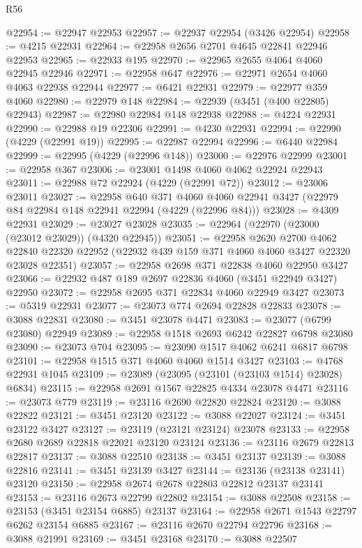 \begin{lexlean}{R56}
\begin{coremodule}
@22954 := @22947 @22953
@22957 := @22937 @22954 (@3426 @22954)
@22958 := @4215 @22931
@22964 := @22958 @2656 @2701 @4645 @22841 @22946 @22953
@22965 := @22933 @195
@22970 := @22965 @2655 @4064 @4060 @22945 @22946
@22971 := @22958 @647
@22976 := @22971 @2654 @4060 @4063 @22938 @22944
@22977 := @6421 @22931
@22979 := @22977 @359 @4060
@22980 := @22979 @148
@22984 := @22939 (@3451 (@400 @22805) @22943)
@22987 := @22980 @22984 @148 @22938
@22988 := @4224 @22931
@22990 := @22988 @19 @22306
@22991 := @4230 @22931
@22994 := @22990 (@4229 (@22991 @19))
@22995 := @22987 @22994
@22996 := @6440 @22984
@22999 := @22995 (@4229 (@22996 @148))
@23000 := @22976 @22999
@23001 := @22958 @367
@23006 := @23001 @1498 @4060 @4062 @22924 @22943
@23011 := @22988 @72 @22924 (@4229 (@22991 @72))
@23012 := @23006 @23011
@23027 := @22958
    @640
    @371
    @4060
    @4060
    @22941
    @3427
    (@22979 @84 @22984 @148 @22941 @22994 (@4229 (@22996 @84)))
@23028 := @4309 @22931
@23029 := @23027 @23028
@23035 := @22964 (@22970 (@23000 (@23012 @23029)) (@4320 @22945))
@23051 := @22958
    @2620
    @2700
    @4062
    @22840
    @22320
    @22952
    (@22932 @439 @159 @371 @4060 @4060 @3427 @22320 @23028 @22351)
@23057 := @22958 @2698 @371 @22838 @4060 @22950 @3427
@23066 := @22932 @487 @189 @2697 @22836 @4060 (@3451 @22949 @3427) @22950
@23072 := @22958 @2695 @371 @22834 @4060 @22949 @3427
@23073 := @5319 @22931
@23077 := @23073 @774 @2694 @22828 @22833
@23078 := @3088 @22831
@23080 := @3451 @23078 @4471
@23083 := @23077 (@6799 @23080) @22949
@23089 := @22958 @1518 @2693 @6242 @22827 @6798 @23080
@23090 := @23073 @704
@23095 := @23090 @1517 @4062 @6241 @6817 @6798
@23101 := @22958 @1515 @371 @4060 @4060 @1514 @3427
@23103 := @4768 @22931 @1045
@23109 := @23089 (@23095 (@23101 (@23103 @1514) @23028) @6834)
@23115 := @22958 @2691 @1567 @22825 @4334 @23078 @4471
@23116 := @23073 @779
@23119 := @23116 @2690 @22820 @22824
@23120 := @3088 @22822
@23121 := @3451 @23120
@23122 := @3088 @22027
@23124 := @3451 @23122 @3427
@23127 := @23119 (@23121 @23124) @23078
@23133 := @22958 @2680 @2689 @22818 @22021 @23120 @23124
@23136 := @23116 @2679 @22813 @22817
@23137 := @3088 @22510
@23138 := @3451 @23137
@23139 := @3088 @22816
@23141 := @3451 @23139 @3427
@23144 := @23136 (@23138 @23141) @23120
@23150 := @22958 @2674 @2678 @22803 @22812 @23137 @23141
@23153 := @23116 @2673 @22799 @22802
@23154 := @3088 @22508
@23158 := @23153 (@3451 @23154 @6885) @23137
@23164 := @22958 @2671 @1543 @22797 @6262 @23154 @6885
@23167 := @23116 @2670 @22794 @22796
@23168 := @3088 @21991
@23169 := @3451 @23168
@23170 := @3088 @22507

\end{coremodule}
\end{lexlean}
